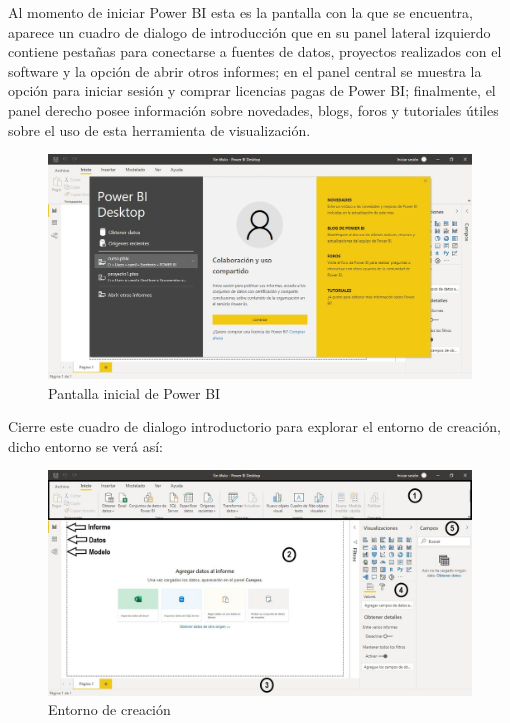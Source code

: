 \documentclass[
]{book}
\begin{document}
Al momento de iniciar Power BI esta es la pantalla con la que se encuentra, aparece un cuadro de dialogo de introducción que en su panel lateral izquierdo contiene pestañas para conectarse a fuentes de datos, proyectos realizados con el software y la opción de abrir otros informes; en el panel central se muestra la opción para iniciar sesión y comprar licencias pagas de Power BI; finalmente, el panel derecho posee información sobre novedades, blogs, foros y tutoriales útiles sobre el uso de esta herramienta de visualización.

\begin{figure}

{\centering \includegraphics[width=0.8\linewidth]{Imágenes/powerbi5} 

}

\caption{Pantalla inicial de Power BI}\label{fig:pantallainicialpowerbi-fig}
\end{figure}

Cierre este cuadro de dialogo introductorio para explorar el entorno de creación, dicho entorno se verá así:

\begin{figure}

{\centering \includegraphics[width=0.8\linewidth]{Imágenes/powerbi6} 

}

\caption{Entorno de creación}\label{fig:entornocreacionpowerbi-fig}
\end{figure}
\end{document}
